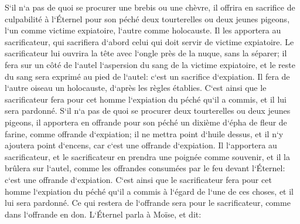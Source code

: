 \verse S`il n`a pas de quoi se procurer une brebis ou une chèvre, il offrira en sacrifice de culpabilité à l`Éternel pour son péché deux tourterelles ou deux jeunes pigeons, l`un comme victime expiatoire, l`autre comme holocauste. 
\verse Il les apportera au sacrificateur, qui sacrifiera d`abord celui qui doit servir de victime expiatoire. Le sacrificateur lui ouvrira la tête avec l`ongle près de la nuque, sans la séparer; 
\verse il fera sur un côté de l`autel l`aspersion du sang de la victime expiatoire, et le reste du sang sera exprimé au pied de l`autel: c`est un sacrifice d`expiation. 
\verse Il fera de l`autre oiseau un holocauste, d`après les règles établies. C`est ainsi que le sacrificateur fera pour cet homme l`expiation du péché qu`il a commis, et il lui sera pardonné. 
\verse S`il n`a pas de quoi se procurer deux tourterelles ou deux jeunes pigeons, il apportera en offrande pour son péché un dixième d`épha de fleur de farine, comme offrande d`expiation; il ne mettra point d`huile dessus, et il n`y ajoutera point d`encens, car c`est une offrande d`expiation. 
\verse Il l`apportera au sacrificateur, et le sacrificateur en prendra une poignée comme souvenir, et il la brûlera sur l`autel, comme les offrandes consumées par le feu devant l`Éternel: c`est une offrande d`expiation. 
\verse C`est ainsi que le sacrificateur fera pour cet homme l`expiation du péché qu`il a commis à l`égard de l`une de ces choses, et il lui sera pardonné. Ce qui restera de l`offrande sera pour le sacrificateur, comme dans l`offrande en don. 
\verse L`Éternel parla à Moïse, et dit: 
